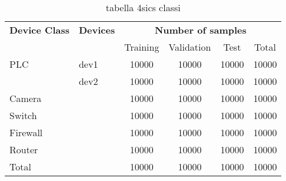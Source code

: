 \begin{table}
\centering
\begin{tabular}{llcccc}
\toprule
\textbf{Device Class} & \textbf{Devices} & \multicolumn{4}{c}{\textbf{Number of samples}} \\
& & Training & Validation & Test & Total \\
\midrule
\multirow{1}{*}{PLC}      & dev1& 10000 & 10000 & 10000 & 10000  \\
                         & dev2 & 10000 & 10000 & 10000 & 10000  \\
\midrule
\multirow{1}{*}{Camera}  & & 10000 & 10000 & 10000 & 10000 \\
\midrule
\multirow{1}{*}{Switch} & & 10000 & 10000 & 10000 & 10000 \\
\midrule
\multirow{1}{*}{Firewall}& & 10000 & 10000 & 10000 & 10000 \\
\midrule
\multirow{1}{*}{Router} &  &10000 & 10000 & 10000 & 10000  \\
\midrule
\midrule
Total & & 10000 & 10000 & 10000 & 10000 \\
\bottomrule
\end{tabular}
\caption{tabella 4sics classi}
\label{tab:iotdev}
\end{table}